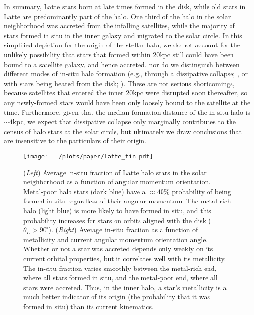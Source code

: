 \documentclass[apj, twocolappendix, numberedappendix, appendixfloats]{emulateapj}
\begin{document}
In summary, Latte stars born at late times formed in the disk, while old stars in Latte are predominantly part of the halo.
One third of the halo in the solar neighborhood was accreted from the infalling satellites, while the majority of stars formed in situ in the inner galaxy and migrated to the solar circle.
In this simplified depiction for the origin of the stellar halo, we do not account for the unlikely possibility that stars that formed within 20\;kpc still could have been bound to a satellite galaxy, and hence accreted, nor do we distinguish between different modes of in-situ halo formation (e.g., through a dissipative collapse; \citealt{samland2003}, or with stars being heated from the disk; \citealt{purcell2010}).
These are not serious shortcomings, because satellites that entered the inner 20\;kpc were disrupted soon thereafter, so any newly-formed stars would have been only loosely bound to the satellite at the time.
Furthermore, given that the median formation distance of the in-situ halo is $\sim4$\;kpc, we expect that dissipative collapse only marginally contributes to the census of halo stars at the solar circle, but ultimately we draw conclusions that are insensitive to the particulars of their origin.

\begin{figure*}
\begin{center}
\texttt{[image: ../plots/paper/latte\_fin.pdf]}
\caption{(\emph{Left}) Average in-situ fraction of Latte halo stars in the solar neighborhood as a function of angular momentum orientation.
Metal-poor halo stars (dark blue) have a $\approx40\%$ probability of being formed in situ regardless of their angular momentum.
The metal-rich halo (light blue) is more likely to have formed in situ, and this probability increases for stars on orbits aligned with the disk ($\theta_L>90^\circ$).
(\emph{Right}) Average in-situ fraction as a function of metallicity and current angular momentum orientation angle.
Whether or not a star was accreted depends only weakly on its current orbital properties, but it correlates well with its metallicity.
The in-situ fraction varies smoothly between the metal-rich end, where all stars formed in situ, and the metal-poor end, where all stars were accreted.
Thus, in the inner halo, a star's metallicity is a much better indicator of its origin (the probability that it was formed in situ) than its current kinematics.
}
\label{fig:facc}
\end{center}
\end{figure*}
\end{document}
